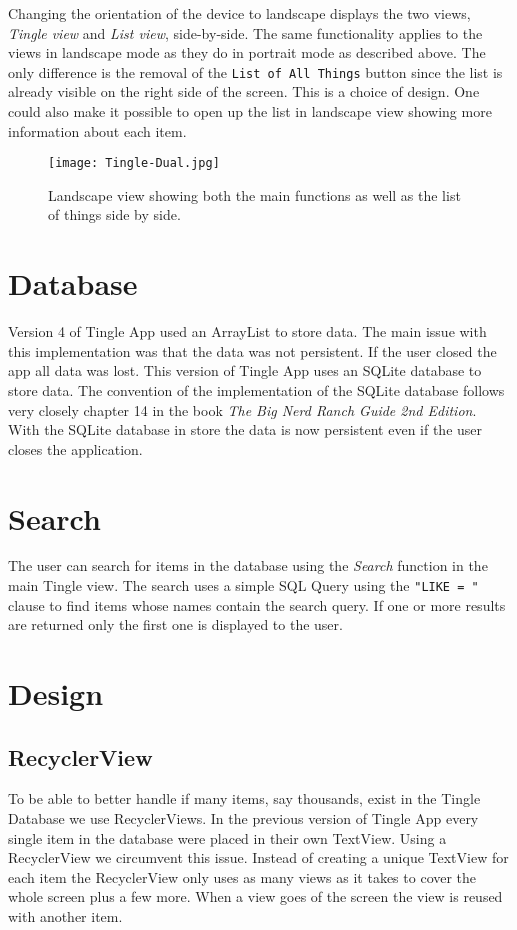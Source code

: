 \pagebreak
Changing the orientation of the device to landscape displays the two views, \emph{Tingle view }and \emph{List view}, side-by-side. The same functionality applies to the views in landscape mode as they do in portrait mode as described above. The only difference is the removal of the \texttt{List of All Things} button since the list is already visible on the right side of the screen. This is a choice of design. One could also make it possible to open up the 
list in landscape view showing more information about each item.

\begin{figure}[H]
	\centering
	\texttt{[image: Tingle-Dual.jpg]}
	\caption{Landscape view showing both the main functions as well as the list of things side by side.}
	\label{fig:landscape-main-view}
\end{figure}

\section{Database}
Version 4 of Tingle App used an ArrayList to store data. The main issue with this implementation was that the data was not persistent. If the user closed the app all data was lost. This version of Tingle App uses an SQLite database to store data. The convention of the implementation of the SQLite database follows very closely chapter 14 in the book \emph{The Big Nerd Ranch Guide 2nd Edition}. With the SQLite database in store the data is now persistent even if the user closes the application.

\section{Search}
The user can search for items in the database using the \emph{Search} function in the main Tingle view. The search uses a simple SQL Query using the \texttt{"LIKE = "} clause to find items whose names contain the search query. If one or more results are returned only the first one is displayed to the user.

\section{Design}
\subsection{RecyclerView}
To be able to better handle if many items, say thousands, exist in the Tingle Database we use RecyclerViews. In the previous version of Tingle App every single item in the database were placed in their own TextView. Using a RecyclerView we circumvent this issue. Instead of creating a unique TextView for each item the RecyclerView only uses as many views as it takes to cover the whole screen plus a few more. When a view goes of the screen the view is reused with another item.

